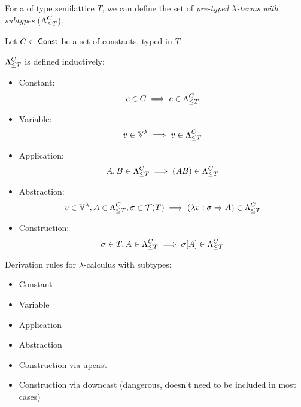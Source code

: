 \documentclass[main.tex]{subfiles}
\begin{document}
For a of type semilattice $T$, we can define the set of
\emph{pre-typed $\lambda$-terms with subtypes} ($\fancylambda{T}{C}$).

\begin{defn}
    Let $C \subset \const$ be a set of constants, typed in $T$.

    $\fancylambda{T}{C}$ is defined inductively:
    \begin{itemize}
        \item Constant:    \[ c \in C \implies c \in \fancylambda{T}{C} \]
        \item Variable:    \[ v \in \lvars \implies v \in \fancylambda{T}{C} \]
        \item Application: \[ A, B \in \fancylambda{T}{C} \implies (AB) \in \fancylambda{T}{C} \]
        \item Abstraction: \[ v \in \lvars, A \in \fancylambda{T}{C}, \sigma \in \tclos{T}
                \implies (\lambda v : \sigma \abstr A) \in \fancylambda{T}{C} \]
        \item Construction: \[ \sigma \in T, A \in \fancylambda{T}{C}
                \implies \sigma[A] \in \fancylambda{T}{C} \]
    \end{itemize}
\end{defn}

\begin{defn}
    \label{def:subtypederiv}
    Derivation rules for $\lambda$-calculus with subtypes:

    \begin{itemize}
        \item Constant
        \item Variable
        \item Application
        \item Abstraction
        \item Construction via upcast
        \item Construction via downcast (dangerous, doesn't need to be included in most cases)
    \end{itemize}
\end{defn}
\end{document}
